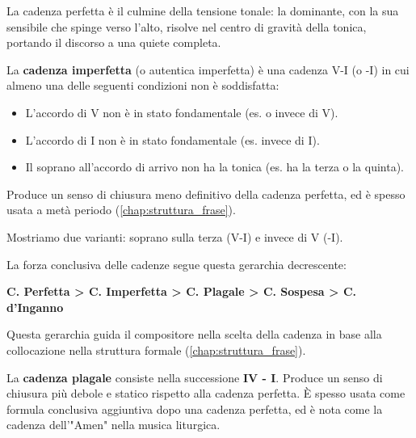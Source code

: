 	La cadenza perfetta è il culmine della tensione tonale: la dominante, con la sua sensibile che spinge verso l'alto, risolve nel centro di gravità della tonica, portando il discorso a una quiete completa.
	
	\begin{esempio}
		\label{ex:cadenza_perfecta}
	\end{esempio}

	\begin{definizione}
		\label{def:cadenza_imperfetta}
		La \textbf{cadenza imperfetta} (o autentica imperfetta) è una cadenza V-I (o -I) in cui almeno una delle seguenti condizioni non è soddisfatta:
		\begin{itemize}
			\item L'accordo di V non è in stato fondamentale (es.  o  invece di V).
			\item L'accordo di I non è in stato fondamentale (es.  invece di I).
			\item Il soprano all'accordo di arrivo non ha la tonica (es. ha la terza o la quinta).
		\end{itemize}
		Produce un senso di chiusura meno definitivo della cadenza perfetta, ed è spesso usata a metà periodo (\ref{chap:struttura_frase}).
	\end{definizione}

	\begin{esempio}
		Mostriamo due varianti: soprano sulla terza (V-I) e  invece di V (-I).
	\end{esempio}

    \begin{regola}
        \label{reg:gerarchia_cadenze}
        La forza conclusiva delle cadenze segue questa gerarchia decrescente:
        \begin{center}
            \textbf{C. Perfetta > C. Imperfetta > C. Plagale > C. Sospesa > C. d'Inganno}
        \end{center}
        Questa gerarchia guida il compositore nella scelta della cadenza in base alla collocazione nella struttura formale (\ref{chap:struttura_frase}).
    \end{regola}
	
	\begin{definizione}
		\label{def:cadenza_plagale}
		La \textbf{cadenza plagale} consiste nella successione \textbf{IV - I}. Produce un senso di chiusura più debole e statico rispetto alla cadenza perfetta. È spesso usata come formula conclusiva aggiuntiva dopo una cadenza perfetta, ed è nota come la cadenza dell'"Amen" nella musica liturgica.
	\end{definizione}
	
